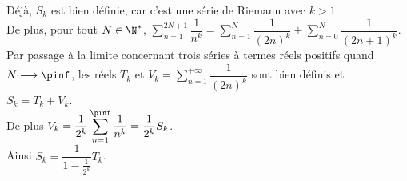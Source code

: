 Déjà, $S_k$ est bien définie, car c'est une série de Riemann avec $k>1$.\\

De plus, pour tout $N\in\N^*$, $\displaystyle\sum_{n=1}^{2N+1} \dfrac{1}{ n^k}=\displaystyle\sum_{n=1}^{N} \dfrac{1}{(2 n)^k}
+\displaystyle\sum_{n=0}^{N} \dfrac{1}{(2 n+1)^k}$. Par passage à la limite concernant trois séries à termes réels positifs quand $N\longrightarrow\pinf$, les réels $T_k$ et $V_k=\displaystyle\sum_{n=1}^{+\infty} \dfrac{1}{(2 n)^k}$ sont bien définis et $S_{k}=T_k+V_k$.\\
De plus $V_k=\dfrac{1}{2^k}\displaystyle\sum_{n=1}^{\pinf} \dfrac{1}{ n^k}=\dfrac{1}{2^k}S_k$.\\
Ainsi $S_k=\dfrac1{1-\frac1{2^k}} T_k$.
